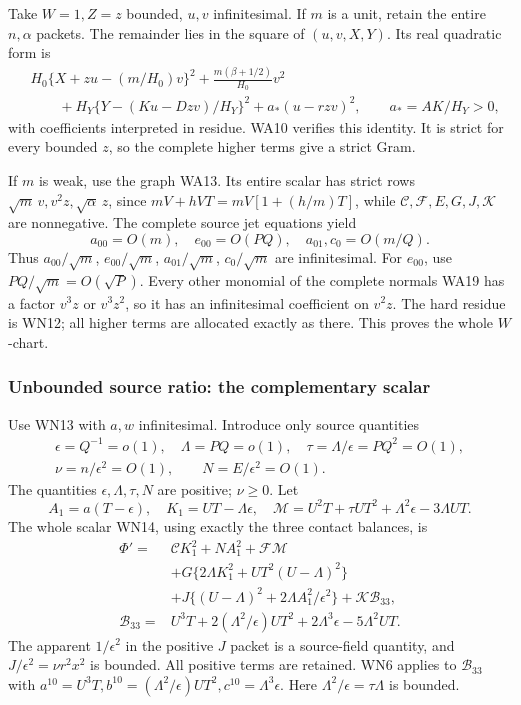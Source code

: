 Take \(W=1,Z=z\) bounded, \(u,v\) infinitesimal. If \(m\) is a
unit, retain the entire \(n,\alpha\) packets. The remainder lies
in the square of \((u,v,X,Y)\). Its real quadratic form is
\[
\begin{split}
 &H_0\{X+zu-(m/H_0)v\}^2+
       \frac{m(\beta+1/2)}{H_0}v^2\\
 &\qquad+H_Y\{Y-(Ku-Dzv)/H_Y\}^2
       +a_*(u-rzv)^2,\qquad a_*=AK/H_Y>0,
\end{split}\tag{WN19}
\]
with coefficients interpreted in residue. WA10 verifies this
identity. It is strict for every bounded \(z\), so the complete
higher terms give a strict Gram.

If \(m\) is weak, use the graph WA13. Its entire scalar has strict
rows \(\sqrt m\,v,v^2z,\sqrt\alpha\,z\), since
\(mV+hVT=mV[1+(h/m)T]\), while \(\mathcal C,\mathcal F,E,G,J,\mathcal K\)
are nonnegative. The complete source jet equations yield
\[
 a_{00}=O(m),\quad e_{00}=O(PQ),\quad
 a_{01},c_0=O(m/Q).
 \tag{WN20}
\]
Thus \(a_{00}/\sqrt m\), \(e_{00}/\sqrt m\),
\(a_{01}/\sqrt m\), \(c_0/\sqrt m\) are infinitesimal.
For \(e_{00}\), use \(PQ/\sqrt m=O(\sqrt P)\).
Every other monomial of the complete normals WA19 has a factor
\(v^3z\) or \(v^3z^2\), so it has an infinitesimal coefficient
on \(v^2z\). The hard residue is WN12; all higher terms are
allocated exactly as there. This proves the whole \(W\)-chart.

\subsubsection*{Unbounded source ratio: the complementary scalar}

Use WN13 with \(a,w\) infinitesimal. Introduce only source quantities
\[
\begin{gathered}
 \epsilon=Q^{-1}=o(1),\quad \Lambda=PQ=o(1),\quad
 \tau=\Lambda/\epsilon=PQ^2=O(1),\\
 \nu=n/\epsilon^2=O(1),\qquad N=E/\epsilon^2=O(1).
\end{gathered}\tag{WN21}
\]
The quantities \(\epsilon,\Lambda,\tau,N\) are positive; \(\nu\geq0\).
Let
\[
 A_1=a(T-\epsilon),\quad K_1=UT-\Lambda\epsilon,\quad
 \mathcal M=U^2T+\tau UT^2+\Lambda^2\epsilon-3\Lambda UT .
 \tag{WN22}
\]
The whole scalar WN14, using exactly the three contact balances, is
\[
\begin{split}
 \Phi'={}&\mathcal C K_1^2+NA_1^2+\mathcal F\mathcal M\\
 &+G\{2\Lambda K_1^2+UT^2(U-\Lambda)^2\}\\
 &+J\{(U-\Lambda)^2+2\Lambda A_1^2/\epsilon^2\}
       +\mathcal K\mathcal B_{33},\\
 \mathcal B_{33}={}&U^3T+2(\Lambda^2/\epsilon)UT^2
                      +2\Lambda^3\epsilon-5\Lambda^2UT .
\end{split}\tag{WN23}
\]
The apparent \(1/\epsilon^2\) in the positive \(J\) packet is
a source-field quantity, and \(J/\epsilon^2=\nu r^2x^2\) is bounded.
All positive terms are retained. WN6 applies to \(\mathcal B_{33}\)
with \(a^{10}=U^3T,b^{10}=(\Lambda^2/\epsilon)UT^2,
c^{10}=\Lambda^3\epsilon\).
Here \(\Lambda^2/\epsilon=\tau\Lambda\) is bounded.


